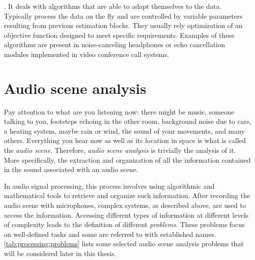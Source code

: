 .
    It deals with algorithms that are able to adapt themselves to the data.
    Typically process the data on the fly and are controlled by variable parameters resulting from previous estimation blocks.
    They usually rely optimization of an objective function designed to meet specific requirements.
    Examples of these algorithms are present in noise-canceling headphones or echo cancellation modules implemented in video conference call systems.



\section{Audio scene analysis}\label{sec:intro:scene}
Pay attention to what are you listening now:
there might be music, someone talking to you, footsteps echoing in the other room, background noise due to cars, a heating system, maybe rain or wind, the sound of your movements, and many others.
Everything you hear now as well as its location in space is what is called the \textit{audio scene}.
Therefore, \textit{audio scene analysis} is trivially the analysis of it.
More specifically, the extraction and organization of all the information contained in the sound associated with an audio scene.

\mynewline
In audio signal processing, this process involves using algorithmic and mathematical tools to retrieve and organize such information.
After recording the audio scene with microphones, complex systems, as described above, are used to access the information.
Accessing different types of information at different levels of complexity leads to the definition of different \textit{problems}.
These problems focus on well-defined tasks and some are referred to with established names.
\cref{tab:processing:problems} lists some selected audio scene analysis problems that will be considered later in this thesis.

